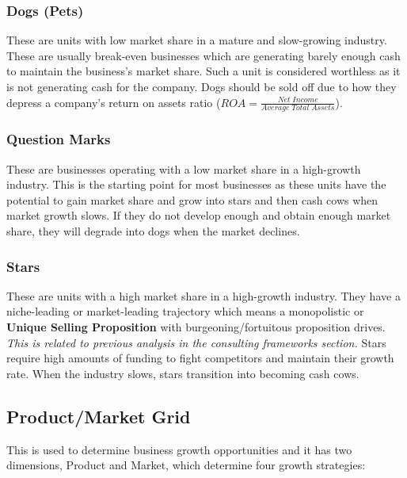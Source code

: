 \documentclass[a4paper]{article}
\begin{document}
{\subsubsection{Dogs (Pets)}
These are units with low market share in a mature and slow-growing industry. These are usually break-even businesses which are generating barely enough cash to maintain the business's market share. Such a unit is considered worthless as it is not generating cash for the company. Dogs should be sold off due to how they depress a company's return on assets ratio ($ROA = \frac{Net\; Income}{Average\; Total\; Assets}$).

\subsubsection{Question Marks}
These are businesses operating with a low market share in a high-growth industry. This is the starting point for most businesses as these units have the potential to gain market share and grow into stars and then cash cows when market growth slows. If they do not develop enough and obtain enough market share, they will degrade into dogs when the market declines.

\subsubsection{Stars}
These are units with a high market share in a high-growth industry. They have a niche-leading or market-leading trajectory which means a monopolistic or \textbf{Unique Selling Proposition} with burgeoning/fortuitous proposition drives. \textit{This is related to previous analysis in the consulting frameworks section.} Stars require high amounts of funding to fight competitors and maintain their growth rate. When the industry slows, stars transition into becoming cash cows.

\subsection{Product/Market Grid}
This is used to determine business growth opportunities and it has two dimensions, Product and Market, which determine four growth strategies:

}
\end{document}
